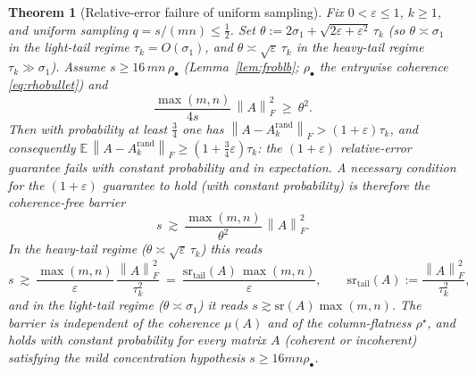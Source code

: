 \documentclass{amsart}
\newtheorem{theorem}{Theorem}
\theoremstyle{definition}
\newcommand{\Frob}[1]{\left\lVert #1\right\rVert_F}
\newcommand{\E}{\mathbb{E}}
\begin{document}
\begin{theorem}[Relative-error failure of uniform sampling]\label{thm:fail}
Fix $0<\varepsilon\le1$, $k\ge1$, and uniform sampling $q=s/(mn)\le\tfrac12$.
Set $\theta:=2\sigma_1+\sqrt{2\varepsilon+\varepsilon^2}\,\tau_k$ (so
$\theta\asymp\sigma_1$ in the light-tail regime $\tau_k=O(\sigma_1)$, and
$\theta\asymp\sqrt\varepsilon\,\tau_k$ in the heavy-tail regime
$\tau_k\gg\sigma_1$). Assume $s\ge16\,mn\,\rho_\bullet$ (Lemma~\ref{lem:froblb};
$\rho_\bullet$ the entrywise coherence \eqref{eq:rhobullet}) and
\begin{equation}\label{eq:failcond}
\frac{\max(m,n)}{4s}\,\Frob A^2\ \ge\ \theta^2 .
\end{equation}
Then with probability at least $\tfrac34$ one has
$\Frob{A-A_k^{\mathrm{rand}}}>(1+\varepsilon)\tau_k$, and consequently
$\E\,\Frob{A-A_k^{\mathrm{rand}}}\ge(1+\tfrac34\varepsilon)\tau_k$: the
$(1+\varepsilon)$ relative-error guarantee fails with constant probability and in
expectation. A necessary condition for the $(1+\varepsilon)$ guarantee to hold
(with constant probability) is therefore the \emph{coherence-free barrier}
\begin{equation}\label{eq:barrier}
s\ \gtrsim\ \frac{\max(m,n)}{\theta^2}\,\Frob A^2 .
\end{equation}
In the heavy-tail regime ($\theta\asymp\sqrt\varepsilon\,\tau_k$) this reads
\begin{equation}\label{eq:barrier2}
s\ \gtrsim\ \frac{\max(m,n)}{\varepsilon}\,\frac{\Frob A^2}{\tau_k^2}
\ =\ \frac{\mathrm{sr}_{\mathrm{tail}}(A)\,\max(m,n)}{\varepsilon},
\qquad \mathrm{sr}_{\mathrm{tail}}(A):=\frac{\Frob A^2}{\tau_k^2},
\end{equation}
and in the light-tail regime ($\theta\asymp\sigma_1$) it reads
$s\gtrsim\mathrm{sr}(A)\max(m,n)$. The barrier is independent of the coherence
$\mu(A)$ and of the column-flatness $\rho^\star$, and holds with constant
probability for \emph{every} matrix $A$ (coherent or incoherent) satisfying the
mild concentration hypothesis $s\ge16mn\rho_\bullet$.
\end{theorem}
\end{document}

